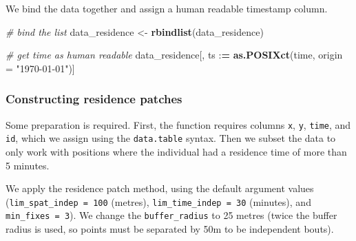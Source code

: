 \documentclass[
]{scrartcl}
\newenvironment{Shaded}{}{}
\newcommand{\CommentTok}[1]{\textcolor[rgb]{0.38,0.63,0.69}{\textit{#1}}}
\newcommand{\DataTypeTok}[1]{\textcolor[rgb]{0.56,0.13,0.00}{#1}}
\newcommand{\DecValTok}[1]{\textcolor[rgb]{0.25,0.63,0.44}{#1}}
\newcommand{\ErrorTok}[1]{\textcolor[rgb]{1.00,0.00,0.00}{\textbf{#1}}}
\newcommand{\KeywordTok}[1]{\textcolor[rgb]{0.00,0.44,0.13}{\textbf{#1}}}
\newcommand{\NormalTok}[1]{#1}
\newcommand{\OperatorTok}[1]{\textcolor[rgb]{0.40,0.40,0.40}{#1}}
\newcommand{\StringTok}[1]{\textcolor[rgb]{0.25,0.44,0.63}{#1}}
\begin{document}
We bind the data together and assign a human readable timestamp column.

\begin{Shaded}
\begin{Highlighting}[]
\CommentTok{\# bind the list}
\NormalTok{data\_residence <{-}}\StringTok{ }\KeywordTok{rbindlist}\NormalTok{(data\_residence)}

\CommentTok{\# get time as human readable}
\NormalTok{data\_residence[, ts }\OperatorTok{:}\ErrorTok{=}\StringTok{ }\KeywordTok{as.POSIXct}\NormalTok{(time, }\DataTypeTok{origin =} \StringTok{"1970{-}01{-}01"}\NormalTok{)]}
\end{Highlighting}
\end{Shaded}

\hypertarget{constructing-residence-patches}{%
\subsubsection{Constructing residence patches}\label{constructing-residence-patches}}

Some preparation is required. First, the function requires columns \texttt{x}, \texttt{y},
\texttt{time}, and \texttt{id}, which we assign using the \texttt{data.table} syntax.
Then we subset the data to only work with positions where the individual had a residence time of more than 5 minutes.

\begin{Shaded}
\end{Shaded}

We apply the residence patch method, using the default argument values (\texttt{lim\_spat\_indep\ =\ 100} (metres), \texttt{lim\_time\_indep\ =\ 30} (minutes), and \texttt{min\_fixes\ =\ 3}). We change the \texttt{buffer\_radius} to 25 metres (twice the buffer radius is used, so points must be separated by 50m to be independent bouts).
\end{document}
